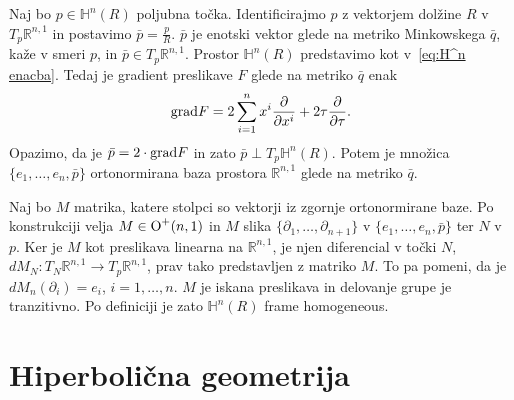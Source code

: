 \documentclass[a4paper]{article}
\begin{document}
Naj bo $p \in \mathbb{H}^{n}(R)$ poljubna točka. Identificirajmo $p$ z vektorjem dolžine $R$ v $T_{p}\mathbb{R}^{n,1}$  in postavimo $\bar{p} = \frac{p}{R}$. $\bar{p}$ je enotski vektor glede na metriko Minkowskega $\bar{q}$, kaže v smeri $p$, in $\bar{p} \in T_{p}\mathbb{R}^{n,1}$.
Prostor $\mathbb{H}^{n}(R)$ predstavimo kot v~\ref{eq:H^n enacba}.
Tedaj je gradient preslikave $F$ glede na metriko $\bar{q}$ enak
\begin{equation}
\textup{grad} F = 2 \sum_{i=1}^{n} x^{i} \frac{\partial}{\partial x^{i}} + 2\tau \frac{\partial}{\partial \tau}. \nonumber
\end{equation} 
Opazimo, da je $\bar{p} = 2 \cdot \textup{grad} F$ in zato $\bar{p} \perp T_{p}\mathbb{H}^{n}(R)$.
Potem je množica $\{ e_{1}, \dots , e_{n}, \bar{p} \}$ ortonormirana baza prostora $\mathbb{R}^{n,1}$ glede na metriko $\bar{q}$.

Naj bo $M$ matrika, katere stolpci so vektorji iz zgornje ortonormirane baze. Po konstrukciji velja $M \in \textup{O}^{+}(n,1)$ in $M$ slika $\{\partial_{1}, \dots , \partial_{n+1} \}$ v $\{e_{1}, \dots , e_{n}, \bar{p} \}$ ter $N$ v $p$.
Ker je $M$ kot preslikava linearna na $\mathbb{R}^{n,1}$, je njen diferencial v točki $N$, $dM_{N} \colon T_{N}\mathbb{R}^{n,1} \to T_{p}\mathbb{R}^{n,1}$, prav tako predstavljen z matriko $M$. To pa pomeni, da je $dM_{n}(\partial_{i}) = e_{i}$, $i = 1, \dots , n$.
$M$ je iskana preslikava in delovanje grupe je tranzitivno. Po definiciji je zato $\mathbb{H}^{n}(R)$ frame homogeneous.

\section{Hiperbolična geometrija}


\begin{thebibliography}{99}

\end{thebibliography}
\end{document}
